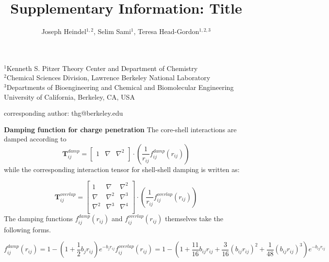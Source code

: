\documentclass[12pt,letter]{article}
\begin{document}
\title{Supplementary Information: Title}
\author{Joseph Heindel$^{1,2}$, Selim Sami$^{1}$, Teresa Head-Gordon$^{1,2,3}$}
\date{\vspace{-10ex}}
\maketitle
\noindent
\begin{center}
$^1$Kenneth S. Pitzer Theory Center and Department of Chemistry\\
$^2$Chemical Sciences Division, Lawrence Berkeley National Laboratory\\
$^3$Departments of Bioengineering and Chemical and Biomolecular Engineering\\
University of California, Berkeley, CA, USA


corresponding author: thg@berkeley.edu
\end{center}

\newpage
\textbf{Damping function for charge penetration}
The core-shell interactions are damped according to
\begin{equation}
  \bm{T}_{ij}^{damp}=
  \begin{bmatrix}
    1 & \nabla & \nabla^2 \\
  \end{bmatrix}\cdot
  \left(\frac{1}{r_{ij}}f_{ij}^{damp}(r_{ij})\right)
  \label{eq:T_damp}
\end{equation}
\noindent
while the corresponding interaction tensor for shell-shell damping is written as:

\begin{equation}
  \bm{T}_{ij}^{overlap}=
  \begin{bmatrix}
    1 & \nabla & \nabla^2 \\
    \nabla & \nabla^2 & \nabla^3 \\
    \nabla^2 & \nabla^3 & \nabla^4 \\
  \end{bmatrix}\cdot
  \left(\frac{1}{r_{ij}}f_{ij}^{overlap}(r_{ij})\right)
  \label{eq:T_overlap}
\end{equation}
\noindent
The damping functions $f_{ij}^{damp}(r_{ij})$ and $f_{ij}^{overlap}(r_{ij})$ themselves take the following forms.

\begin{subequations}
  \begin{equation}
    f_{ij}^{damp}(r_{ij})=1-\left(1+\frac12b_{j}r_{ij}\right)e^{-b_{j}r_{ij}}
    \label{eq:damp_a}
  \end{equation}
  \begin{equation}
    f_{ij}^{overlap}(r_{ij})=1-\left(1+\frac{11}{16}b_{ij}r_{ij}+\frac{3}{16}(b_{ij}r_{ij})^2+\frac{1}{48}(b_{ij}r_{ij})^3\right)e^{-b_{ij}r_{ij}} 
    \label{eq:damp_b}
  \end{equation}
\end{subequations}
\noindent
\end{document}
